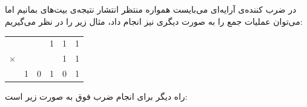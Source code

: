 \documentclass{article}
\begin{document}
\subsection{}
در ضرب کننده‌ی آرایه‌ای می‌بایست همواره منتظر انتشار نتیجه‌ی بیت‌های  بمانیم اما می‌توان عملیات جمع را به صورت دیگری نیز انجام داد، مثال زیر را در نظر می‌گیریم:
\begin{center}
\begin{latin}
\begin{tabular}{c@{\,}c@{\,}c@{\,}c@{\,}c@{\,}c}
 && & 1 & 1 & 1 \\
$\times$ &&&   & 1 & 1 \\
\hline
  & 1 & 0 & 1 & 0 & 1 \\
\end{tabular}
\end{latin}
\end{center}
\noindent
راه دیگر برای انجام ضرب فوق به صورت زیر است:
\end{document}
